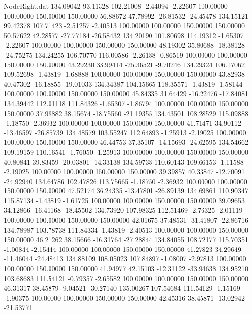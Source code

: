 \begin{filecontents}{NodeRight.dat}
 134.09042   93.11328  102.21008    -2.44094   -2.22607  100.00000  100.00000  150.00000  150.00000   56.88672   47.78992  -26.81532  -24.45478
 134.15121   99.42378  107.71423    -2.51257   -2.40513  100.00000  100.00000  150.00000  150.00000   50.57622   42.28577  -27.77184  -26.58432
 134.20190  101.80698  114.19312    -1.65307   -2.22607  100.00000  100.00000  150.00000  150.00000   48.19302   35.80688  -18.38128  -24.75275
 134.24255  106.70770  116.00586    -2.26188   -0.86519  100.00000  100.00000  150.00000  150.00000   43.29230   33.99414  -25.36521   -9.70246
 134.29324  106.17062  109.52698    -1.43819   -1.68888  100.00000  100.00000  150.00000  150.00000   43.82938   40.47302  -16.18855  -19.01033
 134.34387  104.15665  118.35571    -1.43819   -1.58144  100.00000  100.00000  150.00000  150.00000   45.84335   31.64429  -16.22476  -17.84081
 134.39442  112.01118  111.84326    -1.65307   -1.86794  100.00000  100.00000  150.00000  150.00000   37.98882   38.15674  -18.75560  -21.19355
 134.43501  108.28529  115.09888    -1.18750   -2.36932  100.00000  100.00000  150.00000  150.00000   41.71471   34.90112  -13.46597  -26.86739
 134.48579  103.55247  112.64893    -1.25913   -2.19025  100.00000  100.00000  150.00000  150.00000   46.44753   37.35107  -14.15693  -24.62595
 134.54662  109.19159  110.16541    -1.76050   -1.25913  100.00000  100.00000  150.00000  150.00000   40.80841   39.83459  -20.03801  -14.33138
 134.59738  110.60143  109.66153    -1.11588   -2.19025  100.00000  100.00000  150.00000  150.00000   39.39857   40.33847  -12.70091  -24.92940
 134.64786  102.47826  113.75665    -1.18750   -2.36932  100.00000  100.00000  150.00000  150.00000   47.52174   36.24335  -13.47801  -26.89139
 134.69861  110.90347  115.87134    -1.43819   -1.61725  100.00000  100.00000  150.00000  150.00000   39.09653   34.12866  -16.41168  -18.45502
 134.73920  107.98325  112.51469    -2.76325   -2.01119  100.00000  100.00000  150.00000  150.00000   42.01675   37.48531  -31.41807  -22.86716
 134.78987  103.78738  111.84334    -1.43819   -2.40513  100.00000  100.00000  150.00000  150.00000   46.21262   38.15666  -16.31764  -27.28844
 134.84055  108.72177  115.70351    -1.00844   -2.15444  100.00000  100.00000  150.00000  150.00000   41.27823   34.29649  -11.46044  -24.48413
 134.88109  108.05023  107.84897    -1.08007   -2.97813  100.00000  100.00000  150.00000  150.00000   41.94977   42.15103  -12.31122  -33.94638
 134.95210  103.68683  111.54121    -0.79357   -2.65582  100.00000  100.00000  150.00000  150.00000   46.31317   38.45879   -9.04521  -30.27140
 135.00267  107.54684  111.54129    -1.15169   -1.90375  100.00000  100.00000  150.00000  150.00000   42.45316   38.45871  -13.02942  -21.53771

\end{filecontents}
